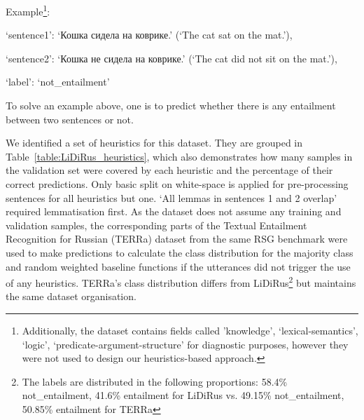 \documentclass[11pt]{article}
\begin{document}
\begin{flushleft}
Example\footnote{Additionally, the dataset contains fields called 'knowledge', `lexical-semantics', `logic', `predicate-argument-structure' for diagnostic purposes, however they were not used to design our heuristics-based approach.}:

`sentence1': \foreignlanguage{russian}{`Кошка сидела на коврике.'} (`The cat sat on the mat.'),

`sentence2': \foreignlanguage{russian}{`Кошка не сидела на коврике.'} (`The cat did not sit on the mat.'),

`label': `not\_entailment'
\end{flushleft}

To solve an example above, one is to predict whether there is any entailment between two sentences or not.

We identified a set of heuristics for this dataset. They are grouped in Table~\ref{table:LiDiRus_heuristics}, which also demonstrates how many samples in the validation set were covered by each heuristic and the percentage of their correct predictions. Only  basic split on white-space is applied for pre-processing sentences for all heuristics but one. `All lemmas in sentences 1 and 2 overlap' required lemmatisation first.
As the dataset does not assume any training and validation samples, the corresponding parts of the Textual Entailment Recognition for Russian (TERRa) dataset from the same RSG benchmark were used to make predictions to calculate the class distribution for the majority class and random weighted baseline functions if the utterances did not trigger the use of any heuristics. TERRa's class distribution differs from LiDiRus\footnote{The labels are distributed in the following proportions: 58.4\% not\_entailment, 41.6\% entailment for LiDiRus vs. 49.15\% not\_entailment, 50.85\% entailment for TERRa} but maintains the same dataset organisation.
\end{document}

